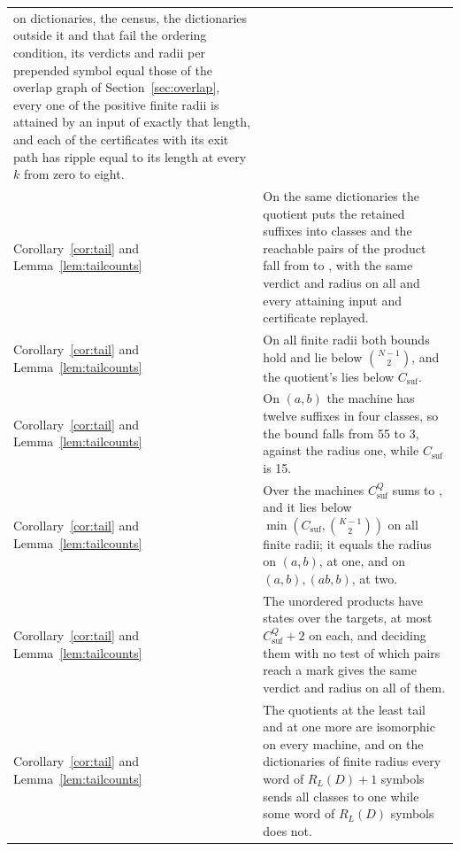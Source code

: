 \documentclass[11pt,a4paper]{article}
\theoremstyle{definition}
\theoremstyle{plain}
\newcommand{\ripple}{R_{L}}
\begin{document}
{\begin{longtable}{@{}>{\raggedright\arraybackslash}p{}>{\raggedright\arraybackslash}p{}@{}}
on \TailDictionaries{} dictionaries, the census, the \HardCases{} dictionaries outside it and \TailUnordered{} that fail
the ordering condition, its \TailComparisons{} verdicts and radii per prepended symbol equal those of the overlap graph
of Section~\ref{sec:overlap}, every one of the \TailAttaining{} positive finite radii is attained by an input of exactly
that length, and each of the \TailInfinite{} certificates with its exit path has ripple equal to its length at every
\(k\)
from zero to eight. \\
\addlinespace
{\footnotesize Corollary~\ref{cor:tail} and Lemma~\ref{lem:tailcounts}} & On the same dictionaries the quotient puts the
\TailSuffixes{} retained suffixes into \TailClasses{} classes and the reachable pairs of the product fall from
\TailPairs{} to \TailQuotientPairs{}, with the same verdict and radius on all \TailComparisons{} and every attaining
input and certificate replayed. \\
\addlinespace
{\footnotesize Corollary~\ref{cor:tail} and Lemma~\ref{lem:tailcounts}} & On all \TailFinite{} finite radii both bounds
hold and lie below \(\binom{N - 1}{2}\), and the quotient's lies below \(C_{\mathrm{suf}}\). \\
\addlinespace
{\footnotesize Corollary~\ref{cor:tail} and Lemma~\ref{lem:tailcounts}} & On \((a, b)\) the machine has twelve suffixes
in four classes, so the bound falls from 55 to 3, against the radius one, while \(C_{\mathrm{suf}}\) is 15. \\
\addlinespace
{\footnotesize Corollary~\ref{cor:tail} and Lemma~\ref{lem:tailcounts}} & Over the \TailDictionaries{} machines
\(C^{Q}_{\mathrm{suf}}\) sums to \TailClassPairs{}, and it lies below \(\min(C_{\mathrm{suf}}, \binom{K - 1}{2})\) on
all \TailFinite{} finite radii; it equals the radius on \((a, b)\), at one, and on \((a, b), (ab, b)\), at two. \\
\addlinespace
{\footnotesize Corollary~\ref{cor:tail} and Lemma~\ref{lem:tailcounts}} & The unordered products have
\TailUnorderedStates{} states over the \TailComparisons{} targets, at most \(C^{Q}_{\mathrm{suf}} + 2\) on each, and
deciding them with no test of which pairs reach a mark gives the same verdict and radius on all of them. \\
\addlinespace
{\footnotesize Corollary~\ref{cor:tail} and Lemma~\ref{lem:tailcounts}} & The quotients at the least tail and at one
more are isomorphic on every machine, and on the \TailReset{} dictionaries of finite radius every word of
\(\ripple(D) + 1\) symbols sends all classes to one while some word of \(\ripple(D)\) symbols does not. \\

\end{longtable}}
\end{document}
